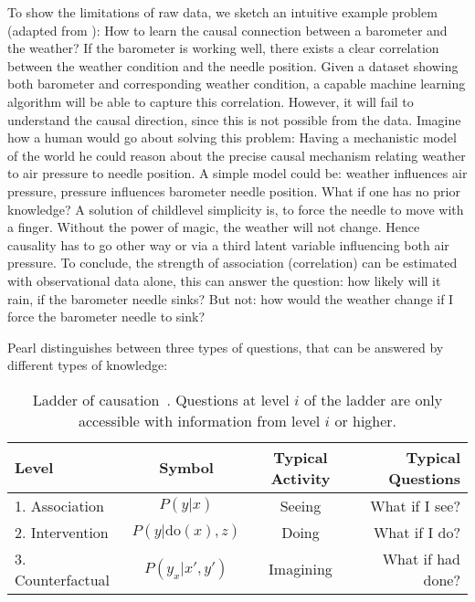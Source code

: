 		To show the limitations of raw data, we sketch an intuitive example problem (adapted from \cite{pearl18why}):
		How to learn the causal connection between a barometer and the weather? If the barometer is working well, there exists a clear correlation between the weather condition and the needle position. Given a dataset showing both barometer and corresponding weather condition, a capable machine learning algorithm will be able to capture this correlation. However, it will fail to understand the causal direction, since this is not possible from the data.
		Imagine how a human would go about solving this problem:
		Having a mechanistic model of the world he could reason about the precise causal mechanism relating weather to air pressure to needle position. A simple model could be: weather influences air pressure, pressure influences barometer needle position.
		What if one has no prior knowledge? A solution of childlevel simplicity is, to force the needle to move with a finger. Without the power of magic, the weather will not change. Hence causality has to go other way or via a third latent variable influencing both \ie air pressure.
		To conclude, the strength of association (correlation) can be estimated with observational data alone, this can answer the question: how likely will it rain, if the barometer needle sinks? But not: how would the weather change if I force the barometer needle to sink?

		Pearl \cite{pearl18why} distinguishes between three types of questions, that can be answered by different types of knowledge:
		\begin{table}[htp]
			\centering
			\caption{Ladder of causation~\cite{pearl18impediments}. Questions at level $i$ of the ladder are only accessible with information from level $i$ or higher.}
			\label{tab:overview}
			\begin{tabular}{l|ccr}
				\hline
				Level & Symbol & Typical Activity & Typical Questions \\ \hline
				1. Association & $P(y|x)$ & Seeing & What if I see?  \\
				2. Intervention& $P(y|\mathrm{do}(x), z)$ & Doing& What if I do?  \\
				3. Counterfactual& $P(y_x|x', y')$ & Imagining & What if had done?  \\ \hline
			\end{tabular}
		\end{table}

